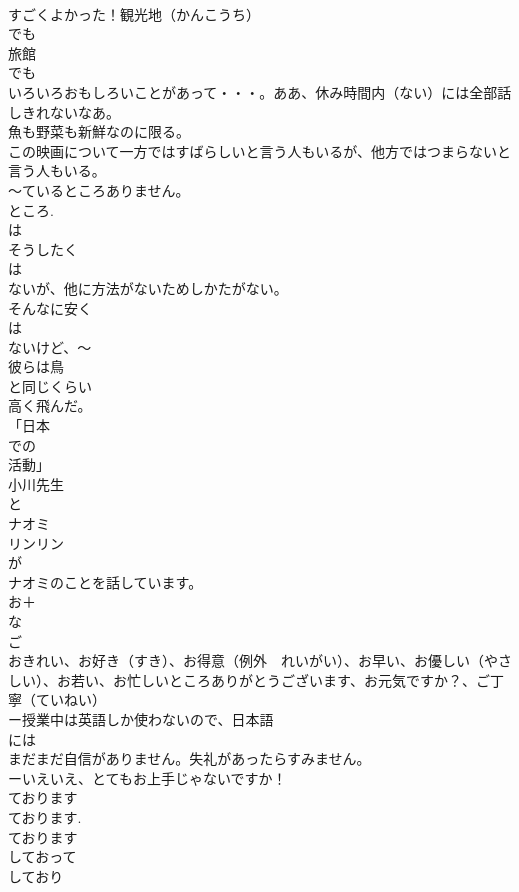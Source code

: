\documentclass[8pt]{extreport}
\begin{document}
\begin{CJK}{UTF8}{min}
\\	すごくよかった！観光地（かんこうち）
\\	でも
\\	旅館
\\	でも
\\	いろいろおもしろいことがあって・・・。ああ、休み時間内（ない）には全部話しきれないなあ。
\\	魚も野菜も新鮮なのに限る。
\\	この映画について一方ではすばらしいと言う人もいるが、他方ではつまらないと言う人もいる。
\\	～ているところありません。
\\	ところ.
\\	は
\\	そうしたく
\\	は
\\	ないが、他に方法がないためしかたがない。
\\	そんなに安く
\\	は
\\	ないけど、～
\\	彼らは鳥
\\	と同じくらい
\\	高く飛んだ。	
\\	「日本
\\	での
\\	活動」	
\\	小川先生
\\	と
\\	ナオミ
\\	リンリン
\\	が
\\	ナオミのことを話しています。	
\\	お＋
\\	な
\\	ご 
\\	おきれい、お好き（すき）、お得意（例外　れいがい）、お早い、お優しい（やさしい）、お若い、お忙しいところありがとうございます、お元気ですか？、ご丁寧（ていねい）
\\	ー授業中は英語しか使わないので、日本語
\\	には
\\	まだまだ自信がありません。失礼があったらすみません。
\\	ーいえいえ、とてもお上手じゃないですか！
\\	ております
\\	ております. 
\\	ております 
\\	しておって 
\\	しており 

\end{CJK}
\end{document}
